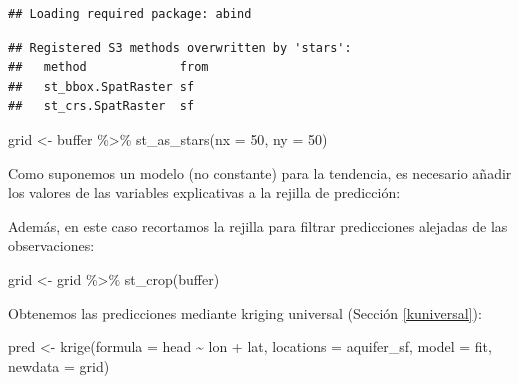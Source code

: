 \documentclass[
  spanish,
]{book}
\newenvironment{Shaded}{\begin{snugshade}}{\end{snugshade}}
\newcommand{\AttributeTok}[1]{\textcolor[rgb]{0.77,0.63,0.00}{#1}}
\newcommand{\DecValTok}[1]{\textcolor[rgb]{0.00,0.00,0.81}{#1}}
\newcommand{\FunctionTok}[1]{\textcolor[rgb]{0.00,0.00,0.00}{#1}}
\newcommand{\NormalTok}[1]{#1}
\newcommand{\OtherTok}[1]{\textcolor[rgb]{0.56,0.35,0.01}{#1}}
\newcommand{\SpecialCharTok}[1]{\textcolor[rgb]{0.00,0.00,0.00}{#1}}
\theoremstyle{break}
\theoremstyle{definition}
\theoremstyle{definition}
\theoremstyle{definition}
\theoremstyle{definition}
\theoremstyle{remark}
\begin{document}
\begin{verbatim}
## Loading required package: abind
\end{verbatim}

\begin{verbatim}
## Registered S3 methods overwritten by 'stars':
##   method             from
##   st_bbox.SpatRaster sf  
##   st_crs.SpatRaster  sf
\end{verbatim}

\begin{Shaded}
\begin{Highlighting}[]
\NormalTok{grid }\OtherTok{\textless{}{-}}\NormalTok{ buffer }\SpecialCharTok{\%\textgreater{}\%}  \FunctionTok{st\_as\_stars}\NormalTok{(}\AttributeTok{nx =} \DecValTok{50}\NormalTok{, }\AttributeTok{ny =} \DecValTok{50}\NormalTok{)}
\end{Highlighting}
\end{Shaded}

Como suponemos un modelo (no constante) para la tendencia, es necesario añadir los valores de las variables explicativas a la rejilla de predicción:

\begin{Shaded}
\end{Shaded}

Además, en este caso recortamos la rejilla para filtrar predicciones alejadas de las observaciones:

\begin{Shaded}
\begin{Highlighting}[]
\NormalTok{grid }\OtherTok{\textless{}{-}}\NormalTok{ grid }\SpecialCharTok{\%\textgreater{}\%} \FunctionTok{st\_crop}\NormalTok{(buffer)}
\end{Highlighting}
\end{Shaded}

Obtenemos las predicciones mediante kriging universal (Sección \ref{kuniversal}):

\begin{Shaded}
\begin{Highlighting}[]
\NormalTok{pred }\OtherTok{\textless{}{-}} \FunctionTok{krige}\NormalTok{(}\AttributeTok{formula =}\NormalTok{ head }\SpecialCharTok{\textasciitilde{}}\NormalTok{ lon }\SpecialCharTok{+}\NormalTok{ lat, }\AttributeTok{locations =}\NormalTok{ aquifer\_sf, }\AttributeTok{model =}\NormalTok{ fit,}
              \AttributeTok{newdata =}\NormalTok{ grid)}
\end{Highlighting}
\end{Shaded}
\end{document}
